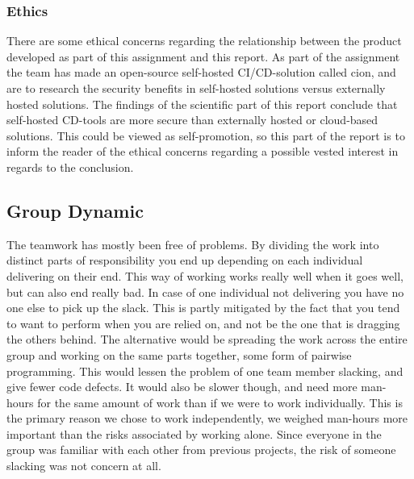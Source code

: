 \subsubsection{Ethics}
There are some ethical concerns regarding the relationship between the product developed as part of this assignment and this report. As part of the assignment the team has made an open-source self-hosted CI/CD-solution called cion, and are to research the security benefits in self-hosted solutions versus externally hosted solutions. The findings of the scientific part of this report conclude that self-hosted \acrshort{CD}-tools are more secure than externally hosted or cloud-based solutions. This could be viewed as self-promotion, so this part of the report is to inform the reader of the ethical concerns regarding a possible vested interest in regards to the conclusion.


\subsection{Group Dynamic}
The teamwork has mostly been free of problems. By dividing the work into distinct parts of responsibility you end up depending on each individual delivering on their end. This way of working works really well when it goes well, but can also end really bad. In case of one individual not delivering you have no one else to pick up the slack. This is partly mitigated by the fact that you tend to want to perform when you are relied on, and not be the one that is dragging the others behind. The alternative would be spreading the work across the entire group and working on the same parts together, some form of pairwise programming. This would lessen the problem of one team member slacking, and give fewer code defects. It would also be slower though, and need more man-hours for the same amount of work than if we were to work individually. This is the primary reason we chose to work independently, we weighed man-hours more important than the risks associated by working alone. Since everyone in the group was familiar with each other from previous projects, the risk of someone slacking was not concern at all.

